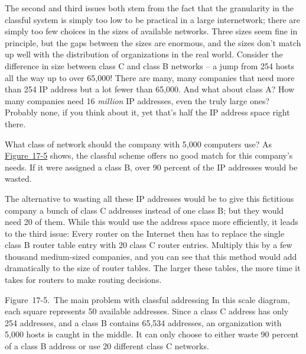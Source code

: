 \documentclass[b5paper,11pt]{memoir}
\begin{document}
The second and third issues both stem from the fact that the
\protect\hypertarget{ch17s07.htmlux5cux23idx-CHP-17-0716}{}{}granularity
in the classful system is simply too low to be practical in a large
internetwork; there are simply too few choices in the sizes of available
networks. Three sizes seem fine in principle, but the gaps between the
sizes are enormous, and the sizes don't match up well with the
distribution of organizations in the real world. Consider the difference
in size between class C and class B networks -- a jump from 254 hosts all
the way up to over 65,000! There are many, many companies that need more
than 254 IP address but a lot fewer than 65,000. And what about class A?
How many companies need 16 {\emph{million}} IP addresses, even the truly
large ones? Probably none, if you think about it, yet that's half the IP
address space right there.

What class of network should the company with 5,000 computers use? As
\protect\hyperlink{ch17s07.htmlux5cux23the_main_problem_with_classful_addressin}{Figure~17-5}
shows, the classful scheme offers no good match for this company's
needs. If it were assigned a class B, over 90 percent of the IP
addresses would be wasted.

The alternative to wasting all these IP addresses would be to give this
fictitious company a bunch of class C addresses instead of one class B;
but they would need 20 of them. While this would use the address space
more efficiently, it leads to the third issue: Every router on the
Internet then has to replace the single class B router table entry with
20 class C router entries. Multiply this by a few thousand medium-sized
companies, and you can see that this method would add dramatically to
the size of router tables. The larger these tables, the more time it
takes for routers to make routing decisions.

\protect\hypertarget{ch17s07.htmlux5cux23the_main_problem_with_classful_addressin}{}{}

\protect\hypertarget{ch17s07.htmlux5cux23I_mediaobject3_d1e17980}{}{}

Figure~17-5.~The main problem with classful addressing In this scale
diagram, each square represents 50 available addresses. Since a class C
address has only 254 addresses, and a class B contains 65,534 addresses,
an organization with 5,000 hosts is caught in the middle. It can only
choose to either waste 90 percent of a class B address or use 20
different class C networks.
\end{document}
